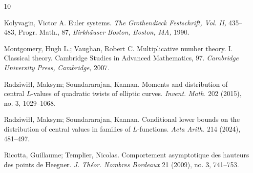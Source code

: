 \documentclass[12pt,reqno]{amsart}
\numberwithin{equation}{section}
\theoremstyle{plain}
\theoremstyle{definition}
\theoremstyle{remark}
\begin{document}
\begin{thebibliography}{10}




Kolyvagin, Victor A.
Euler systems.
\emph{The Grothendieck Festschrift, Vol. II,} 435--483, Progr. Math., 87, \emph{Birkh\"auser Boston, Boston, MA,} 1990.








Montgomery, Hugh L.; Vaughan, Robert C.
Multiplicative number theory. I. Classical theory.
Cambridge Studies in Advanced Mathematics, 97.
\emph{Cambridge University Press, Cambridge,} 2007.




Radziwi\l\l, Maksym; Soundararajan, Kannan.
Moments and distribution of central $L$-values of quadratic twists of elliptic curves.
\emph{Invent. Math.} 202 (2015), no. 3, 1029--1068.


Radziwi\l\l, Maksym; Soundararajan, Kannan. Conditional lower bounds on the distribution of central values in families of $L$-functions.
\emph{Acta Arith.} 214 (2024), 481--497.




Ricotta, Guillaume; Templier, Nicolas. Comportement asymptotique des hauteurs des points de Heegner.
\emph{J. Th\'eor. Nombres Bordeaux} 21 (2009), no. 3, 741--753.



\end{thebibliography}
\end{document}
